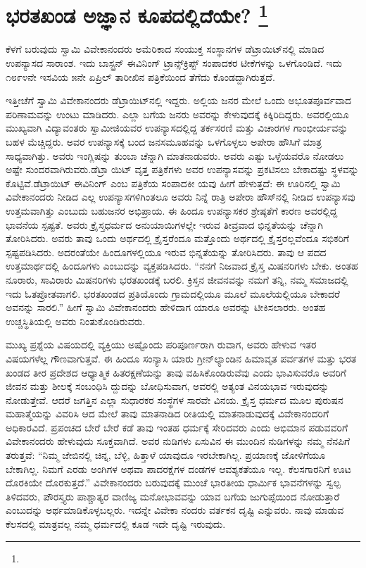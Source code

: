 
\chapter[ಭರತಖಂಡ ಅಜ್ಞಾನ ಕೂಪದಲ್ಲಿದೆಯೇ? ]{ಭರತಖಂಡ ಅಜ್ಞಾನ ಕೂಪದಲ್ಲಿದೆಯೇ? \protect\footnote{}}

ಕೆಳಗೆ ಬರುವುದು ಸ್ವಾಮಿ ವಿವೇಕಾನಂದರು ಅಮೆರಿಕಾದ ಸಂಯುಕ್ತ ಸಂಸ್ಥಾನಗಳ ಡೆಟ್ರಾಯಿಟ್​ನಲ್ಲಿ ಮಾಡಿದ ಉಪನ್ಯಾಸದ ಸಾರಾಂಶ. ಇದು ಬಾಸ್ಟ್ರನ್​ ಈವಿನಿಂಗ್​ ಟ್ರಾನ್ಸ್​ಕ್ರಿಪ್ಟ್ ​ಸಂಪಾದಕರ ಟೀಕೆಗಳನ್ನು ಒಳಗೊಂಡಿದೆ. ಇದು ೧೮೯೪ನೇ ಇಸವಿಯ ೫ನೇ ಏಪ್ರಿಲ್​ ತಾರೀಖಿನ ಪತ್ರಿಕೆಯಿಂದ ತೆಗೆದು ಕೊಂಡದ್ದಾಗಿರುತ್ತದೆ.

ಇತ್ತೀಚೆಗೆ ಸ್ವಾಮಿ ವಿವೇಕಾನಂದರು ಡೆಟ್ರಾಯಿಟ್​ನಲ್ಲಿ ಇದ್ದರು. ಅಲ್ಲಿಯ ಜನರ ಮೇಲೆ ಒಂದು ಅಭೂತಪೂರ್ವವಾದ ಪರಿಣಾಮವನ್ನು ಉಂಟು ಮಾಡಿದರು. ಎಲ್ಲಾ ಬಗೆಯ ಜನರು ಅವರನ್ನು ಕೇಳುವುದಕ್ಕೆ ಕಿಕ್ಕಿರಿದಿದ್ದರು. ಅವರಲ್ಲಿಯೂ ಮುಖ್ಯವಾಗಿ ವಿದ್ಯಾವಂತರು ಸ್ವಾಮೀಜಿಯವರ ಉಪನ್ಯಾಸದಲ್ಲಿದ್ದ ತರ್ಕಸರಣಿ ಮತ್ತು ವಿಚಾರಗಳ ಗಾಂಭೀರ್ಯವನ್ನು ಬಹಳ ಮೆಚ್ಚಿದ್ದರು. ಅವರ ಉಪನ್ಯಾಸಕ್ಕೆ ಬಂದ ಜನಸಮೂಹವನ್ನು ಒಳಗೊಳ್ಳಲು ಅಪೇರಾ ಹೌಸಿಗೆ ಮಾತ್ರ ಸಾಧ್ಯವಾಗಿತ್ತು. ಅವರು ಇಂಗ್ಲಿಷನ್ನು ತುಂಬಾ ಚೆನ್ನಾಗಿ ಮಾತನಾಡುವರು. ಅವರು ಎಷ್ಟು ಒಳ್ಳೆಯವರೊ ನೋಡಲು ಅಷ್ಟೇ ಸುಂದರವಾಗಿರುವರು.ಡೆಟ್ರಾ ಯಿಟ್​ ವೃತ್ತ ಪತ್ರಿಕೆಗಳು ಅವರ ಉಪನ್ಯಾಸವನ್ನು ಪ್ರಕಟಿಸಲು ಬೇಕಾದಷ್ಟು ಸ್ಥಳವನ್ನು ಕೊಟ್ಟಿವೆ.ಡೆಟ್ರಾಯಿಟ್​ ಈವಿನಿಂಗ್​ ಎಂಬ ಪತ್ರಿಕೆಯ ಸಂಪಾದಕೀ ಯವು ಹೀಗೆ ಹೇಳುತ್ತದೆ: ಈ ಊರಿನಲ್ಲಿ ಸ್ವಾಮಿ ವಿವೇಕಾನಂದರು ನೀಡಿದ ಎಲ್ಲ ಉಪನ್ಯಾಸಗಳಿಗಿಂತಲೂ ಅವರು ನಿನ್ನೆ ರಾತ್ರಿ ಅಪೇರಾ ಹೌಸ್​ನಲ್ಲಿ ನೀಡಿದ ಉಪನ್ಯಾಸವು ಉತ್ತಮವಾಗಿತ್ತು ಎಂಬುದು ಬಹುಜನರ ಅಭಿಪ್ರಾಯ. ಈ ಹಿಂದೂ ಉಪನ್ಯಾಸಕರ ಶ್ರೇಷ್ಠತೆಗೆ ಕಾರಣ ಅವರಲ್ಲಿದ್ದ ಭಾವನೆಯ ಸ್ಪಷ್ಟತೆ. ಅವರು ಕ್ರೈಸ್ತಧರ್ಮದ ಅನುಯಾಯಿಗಳಲ್ಲೇ ಇರುವ ತೀವ್ರವಾದ ಭಿನ್ನತೆಯನ್ನು ಚೆನ್ನಾಗಿ ತೋರಿಸಿದರು. ಅವರು ತಾವು ಒಂದು ಅರ್ಥದಲ್ಲಿ ಕ್ರೈಸ್ತರೆಂದೂ ಮತ್ತೊಂದು ಅರ್ಥದಲ್ಲಿ ಕ್ರೈಸ್ತರಲ್ಲವೆಂದೂ ಸಭಿಕರಿಗೆ ಸ್ಪಷ್ಟಪಡಿಸಿದರು. ಅದರಂತೆಯೇ ಹಿಂದೂಗಳಲ್ಲಿಯೂ ಇರುವ ಭಿನ್ನತೆಯನ್ನು ತೋರಿಸಿದರು. ತಾವು ಆ ಪದದ ಉತ್ತಮಾರ್ಥದಲ್ಲಿ ಹಿಂದೂಗಳು ಎಂಬುದನ್ನು ವ್ಯಕ್ತಪಡಿಸಿದರು. “ನನಗೆ ನಿಜವಾದ ಕ್ರೈಸ್ತ ಮಿಷನರಿಗಳು ಬೇಕು. ಅಂತಹ ನೂರಾರು, ಸಾವಿರಾರು ಮಿಷನರಿಗಳು ಭರತಖಂಡಕ್ಕೆ ಬರಲಿ. ಕ್ರಿಸ್ತನ ಜೀವನವನ್ನು ನಮಗೆ ತನ್ನಿ, ನಮ್ಮ ಸಮಾಜದಲ್ಲಿ ಇದು ಓತಪ್ರೋತವಾಗಲಿ. ಭರತಖಂಡದ ಪ್ರತಿಯೊಂದು ಗ್ರಾಮದಲ್ಲಿಯೂ ಮೂಲೆ ಮೂಲೆಯಲ್ಲಿಯೂ ಬೇಕಾದರೆ ಅವನನ್ನು ಸಾರಲಿ.” ಹೀಗೆ ಸ್ವಾಮಿ ವಿವೇಕಾನಂದರು ಹೇಳಿದಾಗ ಯಾರೂ ಅವರನ್ನು ಟೀಕಿಸಲಾರರು. ಅಂತಹ ಉಚ್ಚಸ್ಥಿತಿಯಲ್ಲಿ ಅವರು ನಿಂತುಕೊಂಡಿರುವರು.

ಮುಖ್ಯ ಪ್ರಶ್ನೆಯ ವಿಷಯದಲ್ಲಿ ವ್ಯಕ್ತಿಯು ಅಷ್ಟೊಂದು ಪರಿಪೂರ್ಣರಾಗಿ ರುವಾಗ, ಅವರು ಹೇಳುವ ಇತರ ವಿಷಯಗಳೆಲ್ಲ ಗೌಣವಾಗುತ್ತವೆ. ಈ ಹಿಂದೂ ಸಂನ್ಯಾಸಿ ಯಾರು ಗ್ರೀನ್​ಲ್ಯಾಂಡಿನ ಹಿಮಾವೃತ ಪರ್ವತಗಳ ಮತ್ತು ಭರತ ಖಂಡದ ತೀರ ಪ್ರದೇಶದ ಆಧ್ಯಾತ್ಮಿಕ ಹಿತರಕ್ಷಣೆಯನ್ನು ತಾವು ವಹಿಸಿಕೊಂಡಿರುವೆವು ಎಂದು ಭಾವಿಸುವರೊ ಅವರಿಗೆ ಜೀವನ ಮತ್ತು ಶೀಲಕ್ಕೆ ಸಂಬಂಧಿಸಿ ದ್ದುದನ್ನು ಬೋಧಿಸುವಾಗ, ಅವರಲ್ಲಿ ಅತ್ಯಂತ ವಿನಯಭಾವ ಇರುವುದನ್ನು ನೋಡುತ್ತೇವೆ. ಆದರೆ ಜಗತ್ತಿನ ಎಲ್ಲಾ ಸುಧಾರಕರ ಸಂಸ್ಥೆಗಳ ಸಾರವೇ ವಿನಯ. ಕ್ರೈಸ್ತ ಧರ್ಮದ ಮೂಲ ಪುರುಷನ ಮಹಾತ್ಮೆಯನ್ನು ವಿವರಿಸಿ ಆದ ಮೇಲೆ ತಾವು ಮಾತನಾಡಿದ ರೀತಿಯಲ್ಲಿ ಮಾತನಾಡುವುದಕ್ಕೆ ವಿವೇಕಾನಂದರಿಗೆ ಅಧಿಕಾರವಿದೆ. ಪ್ರಪಂಚದ ಬೇರೆ ಬೇರೆ ಕಡೆ ತಾವು ಇಂತಹ ಧರ್ಮಕ್ಕೆ ಸೇರಿದವರು ಎಂದು ಅಭಿಮಾನ ಪಡುವವರಿಗೆ ವಿವೇಕಾನಂದರು ಹೇಳುವುದು ಸೂಕ್ತವಾಗಿದೆ. ಅವರ ನುಡಿಗಳು ಏಸುವಿನ ಈ ಮುಂದಿನ ನುಡಿಗಳನ್ನು ನಮ್ಮ ನೆನಪಿಗೆ ತರುತ್ತವೆ: “ನಿಮ್ಮ ಜೇಬಿನಲ್ಲಿ ಚಿನ್ನ, ಬೆಳ್ಳಿ, ಹಿತ್ತಾಳೆ ಯಾವುದೂ ಇರಬೇಕಾಗಿಲ್ಲ. ಪ್ರಯಾಣಕ್ಕೆ ಜೋಳಿಗೆಯೂ ಬೇಕಾಗಿಲ್ಲ. ನಿಮಗೆ ಎರಡು ಅಂಗಿಗಳ ಅಥವಾ ಪಾದರಕ್ಷೆಗಳ ದಂಡಗಳ ಆವಶ್ಯಕತೆಯೂ ಇಲ್ಲ. ಕೆಲಸಗಾರನಿಗೆ ಊಟ ದೊರಕಿಯೇ ದೊರಕುತ್ತದೆ.” ವಿವೇಕಾನಂದರು ಬರುವುದಕ್ಕೆ ಮುಂಚೆ ಭಾರತೀಯ ಧಾರ್ಮಿಕ ಭಾವನೆಗಳನ್ನು ಸ್ವಲ್ಪ ತಿಳಿದವರು, ಪೌರಸ್ತ್ಯರು ಪಾಶ್ಚಾತ್ಯರ ವಾಣಿಜ್ಯ ಮನೋಭಾವವನ್ನು ಯಾವ ಬಗೆಯ ಜುಗುಪ್ಸೆಯಿಂದ ನೋಡುತ್ತಾರೆ ಎಂಬುದನ್ನು ಅರ್ಥಮಾಡಿಕೊಳ್ಳಬಲ್ಲರು. ಇದನ್ನೇ ವಿವೇಕಾ ನಂದರು ವರ್ತಕನ ದೃಷ್ಟಿ ಎನ್ನುವರು. ನಾವು ಮಾಡುವ ಕೆಲಸದಲ್ಲಿ ಮಾತ್ರವಲ್ಲ ನಮ್ಮ ಧರ್ಮದಲ್ಲಿ ಕೂಡ ಇದೇ ದೃಷ್ಟಿ ಇರುವುದು.

